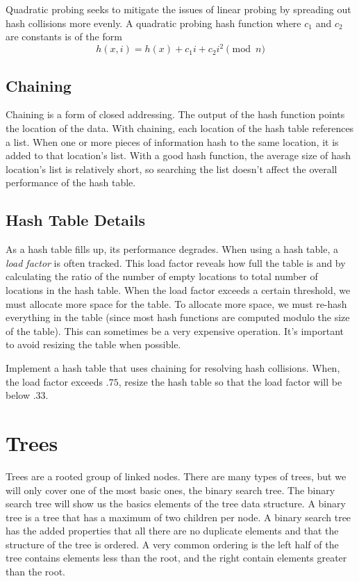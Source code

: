 Quadratic probing seeks to mitigate the issues of linear probing by spreading out hash collisions more evenly.   
A quadratic probing hash function where $c_1$ and $c_2$ are constants is of the form
\begin{equation*}
h(x, i) = h(x) + c_1i + c_2i^2 \pmod{n}
\end{equation*}

\subsection*{Chaining}
Chaining is a form of closed addressing.  The output of the hash function points the location of the data. 
With chaining, each location of the hash table references a list.
When one or more pieces of information hash to the same location, it is added to that location's list.  
With a good hash function, the average size of hash location's list is relatively short,
so searching the list doesn't affect the overall performance of the hash table.

\subsection*{Hash Table Details}
As a hash table fills up, its performance degrades.
When using a hash table, a \emph{load factor} is often tracked.
This load factor reveals how full the table is and by calculating the ratio of the number of empty locations to total number of locations in the hash table.
When the load factor exceeds a certain threshold, we must allocate more space for the table.
To allocate more space, we must re-hash everything in the table (since most hash functions are computed modulo the size of the table).
This can sometimes be a very expensive operation.
It's important to avoid resizing the table when possible.

\begin{problem}
Implement a hash table that uses chaining for resolving hash collisions.
When, the load factor exceeds $.75$, resize the hash table so that the load factor will be below $.33$.
\end{problem}

\section*{Trees}
Trees are a rooted group of linked nodes.  There are many types of trees, but we will only cover one of the most basic ones, the binary search tree.
The binary search tree will show us the basics elements of the tree data structure.
A binary tree is a tree that has a maximum of two children per node.
A binary search tree has the added properties that all there are no duplicate elements
and that the structure of the tree is ordered. 
A very common ordering is the left half of the tree contains elements less than the root, and the right contain elements greater than the root.

